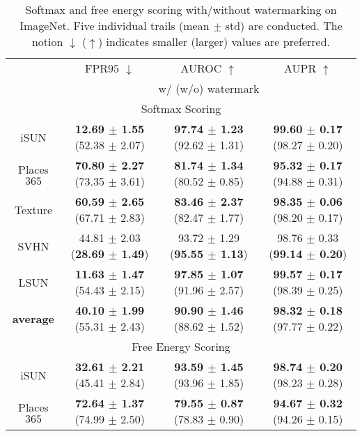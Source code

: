 \documentclass{article}
\begin{document}
\begin{table}[t]
\centering
\caption{Softmax and free energy scoring with/without watermarking on ImageNet. Five individual trails (mean $\pm$ std) are conducted. The notion $\downarrow$ ($\uparrow$) indicates smaller (larger) values are preferred.} \label{tab: imagenet}
\vspace{5pt}
\scriptsize{
\begin{tabular}{c|ccc}
\toprule[1.5pt]
                   & FPR$95$ $\downarrow$     & AUROC $\uparrow$       & AUPR $\uparrow$      \\
                   \cline{2-4} 
\multirow{-2}{*}{} & \multicolumn{3}{c}{w/ (w/o) watermark} \\
\midrule[0.6pt]
\multicolumn{4}{c}{\cellcolor{greyL}Softmax Scoring} \\
\midrule[0.6pt]
iSUN               & \textbf{12.69 $\pm$ 1.55} (52.38 $\pm$ 2.07) & \textbf{97.74 $\pm$ 1.23} (92.62 $\pm$ 1.31) & \textbf{99.60 $\pm$ 0.17} (98.27 $\pm$ 0.20) \\
Places$365$          & \textbf{70.80 $\pm$ 2.27} (73.35 $\pm$ 3.61) & \textbf{81.74 $\pm$ 1.34} (80.52 $\pm$ 0.85) & \textbf{95.32 $\pm$ 0.17} (94.88 $\pm$ 0.31) \\
Texture            & \textbf{60.59 $\pm$ 2.65} ({67.71 $\pm$ 2.83}) & \textbf{83.46 $\pm$ 2.37} ({82.47 $\pm$ 1.77}) & \textbf{98.35 $\pm$ 0.06} ({98.20 $\pm$ 0.17}) \\
SVHN               & {44.81 $\pm$ 2.03} (\textbf{28.69 $\pm$ 1.49}) & {93.72 $\pm$ 1.29} (\textbf{95.55 $\pm$ 1.13}) & {98.76 $\pm$ 0.33} (\textbf{99.14 $\pm$ 0.20}) \\
LSUN             & \textbf{11.63 $\pm$ 1.47} (54.43 $\pm$ 2.15) & \textbf{97.85 $\pm$ 1.07} (91.96 $\pm$ 2.57) & \textbf{99.57 $\pm$ 0.17} (98.39 $\pm$ 0.25) \\
\midrule
\textbf{average}   & \textbf{40.10 $\pm$ 1.99} (55.31 $\pm$ 2.43) & \textbf{90.90 $\pm$ 1.46} (88.62 $\pm$ 1.52) & \textbf{98.32 $\pm$ 0.18} (97.77 $\pm$ 0.22) \\ \midrule[1pt]
\multicolumn{4}{c}{\cellcolor{greyL}Free Energy Scoring} \\
\midrule[1pt]
iSUN               & \textbf{32.61 $\pm$ 2.21} (45.41 $\pm$ 2.84) & \textbf{93.59 $\pm$ 1.45} (93.96 $\pm$ 1.85) & \textbf{98.74 $\pm$ 0.20} (98.23 $\pm$ 0.28) \\ 
Places$365$        & \textbf{72.64 $\pm$ 1.37} (74.99 $\pm$ 2.50) & \textbf{79.55 $\pm$ 0.87} (78.83 $\pm$ 0.90) & \textbf{94.67 $\pm$ 0.32} (94.26 $\pm$ 0.15) \\

\end{tabular}}
\end{table}
\end{document}
